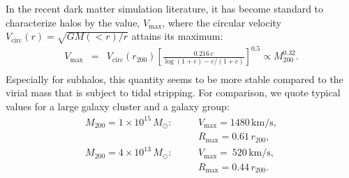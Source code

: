 \documentclass[10pt,aps,pra,reprint,amsmath,amsfonts,amssymb,showpacs,nofootinbib,floatfix]{revtex4-1}
\newcommand{\rmn}{\mathrm}
\newcommand{\msun}{M_\odot}
\newcommand{\rvir}{r_{200}}
\newcommand{\mvir}{M_{200}}
\begin{document}
In the recent dark matter simulation literature, it has become
standard to characterize halos by the value, $V_\rmn{max}$, where the
circular velocity $V_\rmn{circ}(r)=\sqrt{GM(<r)/r}$ attains its
maximum:
\begin{eqnarray}
V_\rmn{max} &=& V_\rmn{circ}(\rvir) 
\left[\frac{0.216\,c}{\log(1+c)-c/(1+c)}\right]^{0.5}\propto \mvir^{0.32}.\nonumber\\
\end{eqnarray}
Especially for subhalos, this quantity seems to be more stable
compared to the virial mass that is subject to tidal stripping. For
comparison, we quote typical values for a large galaxy cluster and a galaxy group:
\begin{eqnarray}
M_{200} = 1\times10^{15}\,\msun:\quad &&V_\rmn{max}=1480\,\rmn{km/s}, \nonumber\\
                                     &&R_\rmn{max}=0.61\,\rvir, \\
M_{200} = 4\times10^{13}\,\msun:\quad &&V_\rmn{max}=~520\,\rmn{km/s}, \nonumber\\
                                     &&R_\rmn{max}=0.44\,\rvir.
\end{eqnarray}
\end{document}
